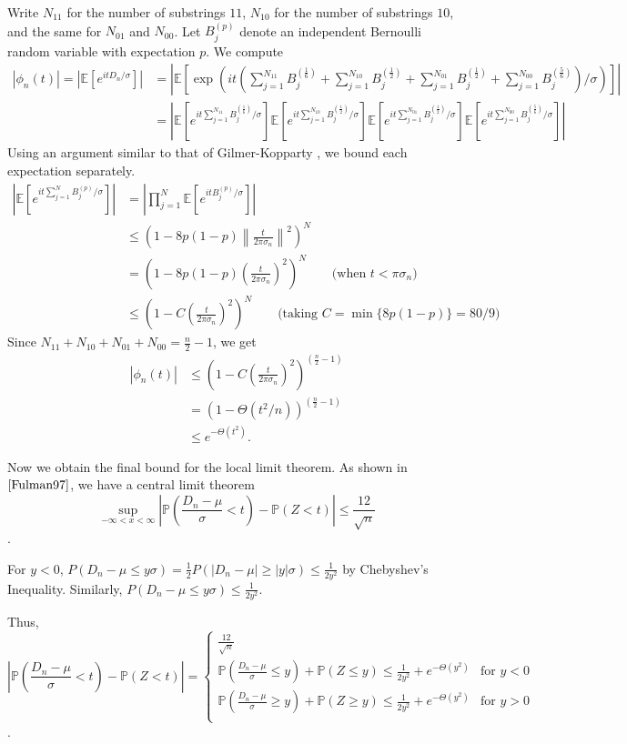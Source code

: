 \documentclass{article}
\newcommand{\p}[1]{\left(#1\right)}
\newcommand{\f}[2]{\frac{#1}{#2}}
\newcommand{\abs}[1]{\left\lvert#1\right\rvert}
\newcommand{\E}{\mathbb{E}}
\renewcommand{\P}{\mathbb{P}}
\newcommand{\norm}[1]{\left\lVert#1\right\rVert}
\newcommand{\s}[1]{\left[#1\right]}
\begin{document}
	Write $N_{11}$ for the number of substrings $11$, $N_{10}$ for the number of substrings $10$, and the same for $N_{01}$ and $N_{00}$. Let $B^{(p)}_j$ denote an independent Bernoulli random variable with expectation $p$. We compute
	\begin{align*}
		\abs{\phi_n(t)}
		= \abs{\E \s{e^{it D_n/\sigma}}}
		&= \abs{\E \s{\exp\p{it\p{\sum_{j=1}^{N_{11}} B^{(\f{1}{6})}_j + \sum_{j=1}^{N_{10}} B^{(\f{1}{2})}_j + \sum_{j=1}^{N_{01}} B^{(\f{1}{2})}_j + \sum_{j=1}^{N_{00}} B^{(\f{5}{6})}_j}/\sigma}}} \\
		&= \abs{
			\E \s{e^{it\sum_{j=1}^{N_{11}} B^{(\f{1}{6})}_j/\sigma}}
			\E \s{e^{it\sum_{j=1}^{N_{10}} B^{(\f{1}{2})}_j/\sigma}}
			\E \s{e^{it\sum_{j=1}^{N_{01}} B^{(\f{1}{2})}_j/\sigma}}
			\E \s{e^{it\sum_{j=1}^{N_{00}} B^{(\f{5}{6})}_j/\sigma}}
		}
	\end{align*}
	Using an argument similar to that of Gilmer-Kopparty \cite{GilmerKopparty14}, we bound each expectation separately.
	\begin{align*}
		\abs{\E \s{e^{it \sum_{j=1}^{N} B^{(p)}_j/\sigma}}}
		&= \abs{\prod_{j=1}^{N} \E \s{e^{it B^{(p)}_j/\sigma}}} \\
		&\leq \p{1 - 8p(1-p) \norm{\f{t}{2\pi \sigma_n}}^2}^N \\
		&= \p{1 - 8p(1-p) \p{\f{t}{2\pi \sigma_n}}^2}^N \qquad \text{(when $t < \pi \sigma_n$)} \\
		&\leq \p{1 - C \p{\f{t}{2\pi \sigma_n}}^2}^N \qquad \text{(taking $C = \min{\{8p(1-p)\}} = 80/9$)}
	\end{align*}
	Since $N_{11} + N_{10} + N_{01} + N_{00} = \f{n}{2} - 1$, we get
	\begin{align*}
		\abs{\phi_n(t)}
		&\leq \p{1 - C \p{\f{t}{2\pi \sigma_n}}^2}^{(\f{n}{2} - 1)} \\
		&= \p{1 - \Theta(t^2/n)}^{(\f{n}{2} - 1)} \\
		&\leq e^{-\Theta(t^2)}.
	\end{align*}

	Now we obtain the final bound for the local limit theorem. As shown in $\cite{Fulman97}$, we have a central limit theorem 
\[ \sup_{ -\infty < x < \infty} \abs{\P(\f{D_n - \mu}{\sigma} < t) - \P(Z < t)} \leq \f{12}{\sqrt{n}} \].

For $y<0$, $P(D_n-\mu \leq y\sigma) = \frac{1}{2} P(\abs{D_n-\mu} \geq \abs{y}\sigma) \leq \frac{1}{2y^2}$ by Chebyshev's Inequality. Similarly, $P(D_n-\mu \leq y\sigma) \leq \frac{1}{2y^2}$. 

Thus, \[\abs{\P(\f{D_n - \mu}{\sigma} < t) - \P(Z < t)} = \begin{cases} 
      \f{12}{\sqrt{n}} \\[10pt]
      \P(\f{D_n - \mu}{\sigma} \leq y) + \P(Z \leq y) \leq \frac{1}{2y^2} + e^{-\Theta(y^2)} & \text{for } y < 0 \\[10pt]
      \P(\f{D_n - \mu}{\sigma} \geq y) + \P(Z\geq y) \leq \frac{1}{2y^2} + e^{-\Theta(y^2)} & \text{for } y > 0 \\[10pt]
\end{cases} \].
\end{document}
